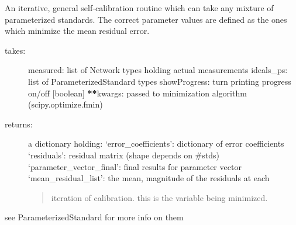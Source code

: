 \documentclass[letterpaper,10pt,english]{sphinxmanual}
\begin{document}
\begin{fulllineitems}
\label{api/mwavepy.calibration:mwavepy.calibration.calibrationAlgorithms.parameterized_self_calibration_bounded}
An iterative, general self-calibration routine which can take any
mixture of parameterized standards. The correct parameter values
are defined as the ones which minimize the mean residual error.
\begin{description}
\item[{takes:}] \leavevmode
measured: list of Network types holding actual measurements
ideals\_ps: list of ParameterizedStandard types
showProgress: turn printing progress on/off {[}boolean{]}
{\color{red}\bfseries{}**}kwargs: passed to minimization algorithm (scipy.optimize.fmin)

\item[{returns:}] \leavevmode
a dictionary holding:
`error\_coefficients': dictionary of error coefficients
`residuals': residual matrix (shape depends on \#stds)
`parameter\_vector\_final': final results for parameter vector
`mean\_residual\_list': the mean, magnitude of the residuals at each
\begin{quote}

iteration of calibration. this is the variable being minimized.
\end{quote}

\end{description}

see  ParameterizedStandard for more info on them

\end{fulllineitems}

\end{document}
